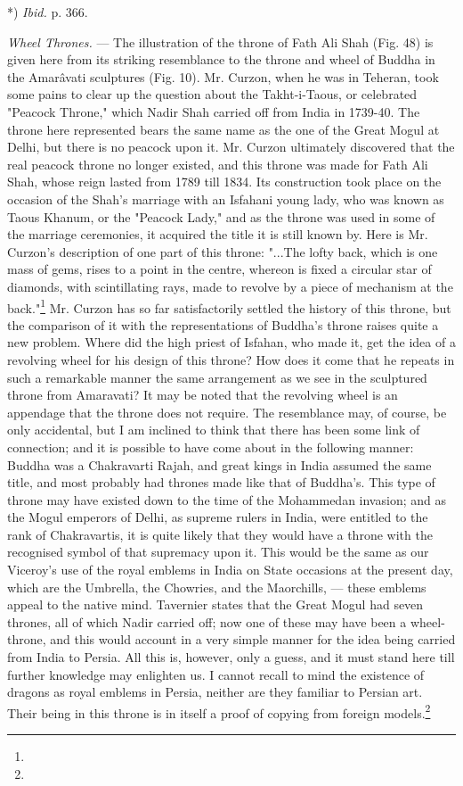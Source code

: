 \documentclass[a4paper, 11pt, oneside, polutonikogreek, english]{article}
\begin{document}
*) \emph{Ibid.} p. 366.

\emph{Wheel Thrones.} --- The illustration of the throne of Fath Ali Shah (Fig. 48) is given here from its striking resemblance to the throne and wheel of Buddha in the Amarâvati sculptures (Fig. 10). Mr. Curzon, when he was in Teheran, took some pains to clear up the question about the Takht-i-Taous, or celebrated "Peacock Throne," which Nadir Shah carried off from India in 1739-40. The throne here represented bears the same name as the one of the Great Mogul at Delhi, but there is no peacock upon it. Mr. Curzon ultimately discovered that the real peacock throne no longer existed, and this throne was made for Fath Ali Shah, whose reign lasted from 1789 till 1834. Its construction took place on the occasion of the Shah's marriage with an Isfahani young lady, who was known as Taous Khanum, or the "Peacock Lady," and as the throne was used in some of the marriage ceremonies, it acquired the title it is still known by. Here is Mr. Curzon's description of one part of this throne: "...The lofty back, which is one mass of gems, rises to a point in the centre, whereon is fixed a circular star of diamonds, with scintillating rays, made to revolve by a piece of mechanism at the back."\footnote{} Mr. Curzon has so far satisfactorily settled the history of this throne, but the comparison of it with the representations of Buddha's throne raises quite a new problem. Where did the high priest of Isfahan, who made it, get the idea of a revolving wheel for his design of this throne? How does it come that he repeats in such a remarkable manner the same arrangement as we see in the sculptured throne from Amaravati? It may be noted that the revolving wheel is an appendage that the throne does not require. The resemblance may, of course, be only accidental, but I am inclined to think that there has been some link of connection; and it is possible to have come about in the following manner: Buddha was a Chakravarti Rajah, and great kings in India assumed the same title, and most probably had thrones made like that of Buddha's. This type of throne may have existed down to the time of the Mohammedan invasion; and as the Mogul emperors of Delhi, as supreme rulers in India, were entitled to the rank of Chakravartis, it is quite likely that they would have a throne with the recognised symbol of that supremacy upon it. This would be the same as our Viceroy's use of the royal emblems in India on State occasions at the present day, which are the Umbrella, the Chowries, and the Maorchills, --- these emblems appeal to the native mind. Tavernier states that the Great Mogul had seven thrones, all of which Nadir carried off; now one of these may have been a wheel-throne, and this would account in a very simple manner for the idea being carried from India to Persia. All this is, however, only a guess, and it must stand here till further knowledge may enlighten us. I cannot recall to mind the existence of dragons as royal emblems in Persia, neither are they familiar to Persian art. Their being in this throne is in itself a proof of copying from foreign models.\footnote{}
\end{document}
